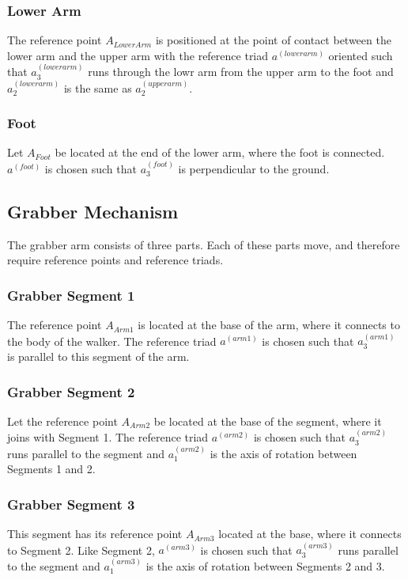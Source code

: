 \documentclass{article}
\begin{document}
\subsubsection{Lower Arm}%
The reference point $A_{LowerArm}$ is positioned at the point of contact between the lower arm and the upper arm with the reference triad $a^{(lowerarm)}$ oriented such that $a_3^{(lowerarm)}$ runs through the lowr arm from the upper arm to the foot and $a_2^{(lowerarm)}$ is the same as $a_2^{(upperarm)}$.%

\subsubsection{Foot}%
Let $A_{Foot}$ be located at the end of the lower arm, where the foot is connected. $a^{(foot)}$ is chosen such that $a_3^{(foot)}$ is perpendicular to the ground.%

\subsection{Grabber Mechanism} %
The grabber arm consists of three parts. Each of these parts move, and therefore require reference points and reference triads.

\subsubsection{Grabber Segment 1}%
The reference point $A_{Arm1}$ is located at the base of the arm, where it connects to the body of the walker. The reference triad $a^{(arm1)}$ is chosen such that $a_3^{(arm1)}$ is parallel to this segment of the arm.%

\subsubsection{Grabber Segment 2}%
Let the reference point $A_{Arm2}$ be located at the base of the segment, where it joins with Segment 1. The reference triad $a^{(arm2)}$ is chosen such that $a_3^{(arm2)}$ runs parallel to the segment and $a_1^{(arm2)}$ is the axis of rotation between Segments 1 and 2.%

\subsubsection{Grabber Segment 3}%
This segment has its reference point $A_{Arm3}$ located at the base, where it connects to Segment 2. Like Segment 2, $a^{(arm3)}$ is chosen such that $a_3^{(arm3)}$ runs parallel to the segment and $a_1^{(arm3)}$ is the axis of rotation between Segments 2 and 3.%
\end{document}
